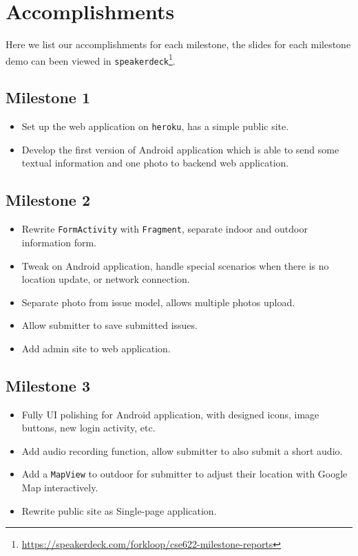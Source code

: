 \documentclass{acm_proc_article-sp}
\begin{document}


\balancecolumns

\clearpage
\appendix
\section{Accomplishments}
Here we list our accomplishments for each milestone, 
the slides for each milestone demo can been viewed in \texttt{speakerdeck}\footnote{\url{https://speakerdeck.com/forkloop/cse622-milestone-reports}}.
\subsection{Milestone 1}
\begin{itemize}
\item
Set up the web application on \texttt{heroku}, has a simple public site.
\item
Develop the first version of Android application which is able to send some textual information and one photo to backend web application.
\end{itemize}

\subsection{Milestone 2}
\begin{itemize}
\item
Rewrite \texttt{FormActivity} with \texttt{Fragment}, separate indoor and outdoor information form.
\item
Tweak on Android application, handle special scenarios when there is no location update, or network connection.
\item
Separate photo from issue model, allows multiple photos upload.
\item
Allow submitter to save submitted issues.
\item
Add admin site to web application.
\end{itemize}
\subsection{Milestone 3}
\begin{itemize}
\item
Fully UI polishing for Android application, with designed icons, image buttons, new login activity, etc.
\item
Add audio recording function, allow submitter to also submit a short audio.
\item
Add a \texttt{MapView} to outdoor for submitter to adjust their location with Google Map interactively.
\item
Rewrite public site as Single-page application.
\end{itemize}
\end{document}

